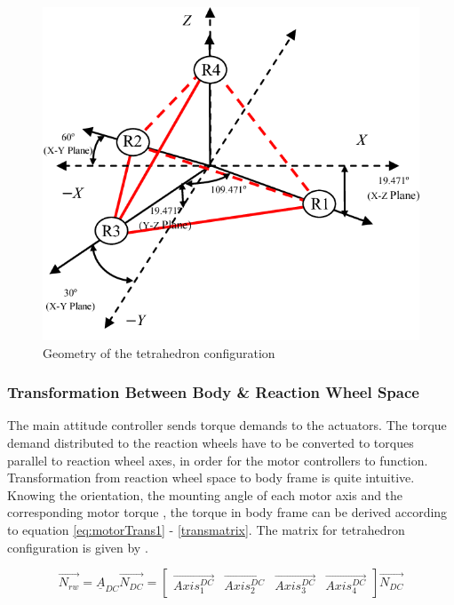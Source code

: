 \begin{figure}[H]
	\centering 
	\includegraphics[width=120mm]{figures/tetrahedron}	
	\caption{Geometry of the tetrahedron configuration}
	\label{fig:tetrahedron}
\end{figure}



\subsubsection{Transformation Between Body \& Reaction Wheel Space}

The main attitude controller sends torque demands to the actuators. The torque demand distributed to the reaction wheels have to be converted to torques parallel to reaction wheel axes, in order for the motor controllers to function. Transformation from reaction wheel space to body frame is quite intuitive. Knowing the orientation, the mounting angle of each motor axis and the corresponding motor torque
, the torque in body frame can be derived according to equation \ref{eq:motorTrans1} - \ref{transmatrix}. The matrix for tetrahedron configuration is given by \cite{reactionWheelConfigThesis}.

\begin{equation}
\label{eq:motorTrans1}
\vec{N_{rw}} = \underline{A}_{DC} \vec{N_{DC}} = \begin{bmatrix}
\vec{Axis^{DC}_{1}}       & \vec{Axis^{DC}_{2}}   & \vec{Axis^{DC}_{3}}   & \vec{Axis^{DC}_{4}} 
\end{bmatrix} \vec{N_{DC}}
\end{equation}

